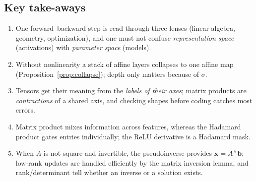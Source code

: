 \documentclass[11pt,a4paper]{article}
\newcommand{\pinv}{^{\#}}
\theoremstyle{definition}
\theoremstyle{plain}
\begin{document}
\subsection{Key take-aways}
\begin{enumerate}
  \item One forward--backward step is read through three lenses (linear algebra, geometry, optimization), and one must not confuse \emph{representation space} (activations) with \emph{parameter space} (models).
  \item Without nonlinearity a stack of affine layers collapses to one affine map (Proposition~\ref{prop:collapse}); depth only matters because of $\sigma$.
  \item Tensors get their meaning from the \emph{labels of their axes}; matrix products are \emph{contractions} of a shared axis, and checking shapes before coding catches most errors.
  \item Matrix product mixes information across features, whereas the Hadamard product gates entries individually; the ReLU derivative is a Hadamard mask.
  \item When $A$ is not square and invertible, the pseudoinverse provides $\mathbf x=A\pinv\mathbf b$; low-rank updates are handled efficiently by the matrix inversion lemma, and rank/determinant tell whether an inverse or a solution exists.
\end{enumerate}
\end{document}
